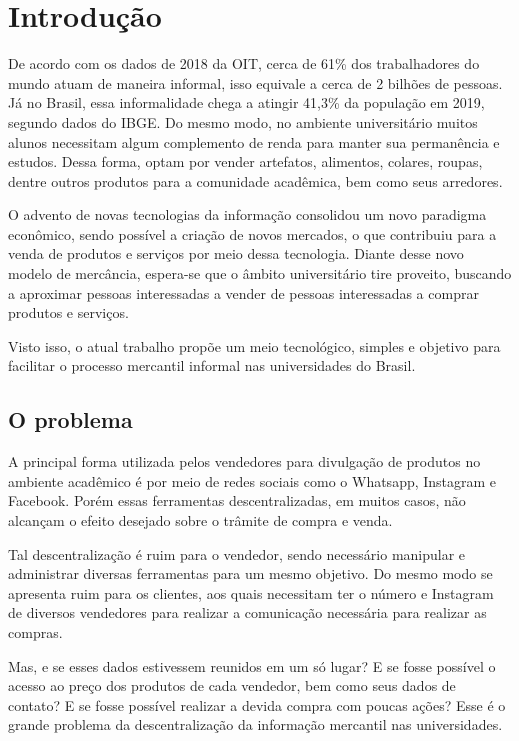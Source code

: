 \chapter{Introdução}


De acordo com os dados de 2018 da OIT\cite{grimshaw2019resumen}, cerca de 61\% dos trabalhadores do mundo atuam de maneira informal, isso equivale a cerca de 2 bilhões de pessoas. Já no Brasil, essa informalidade chega a atingir 41,3\% da população em 2019, segundo dados do IBGE. Do mesmo modo, no ambiente universitário muitos alunos necessitam algum complemento de renda para manter sua permanência e estudos. Dessa forma, optam por vender artefatos, alimentos, colares, roupas, dentre outros produtos para a comunidade acadêmica, bem como seus arredores.

O advento de novas tecnologias da informação consolidou um novo paradigma econômico, sendo possível a criação de novos mercados, o que contribuiu para a venda de produtos e serviços por meio dessa tecnologia. Diante desse novo modelo de mercância, espera-se que o âmbito universitário tire proveito, buscando a aproximar pessoas interessadas a vender de pessoas interessadas a comprar produtos e serviços.

Visto isso, o atual trabalho propõe um meio tecnológico, simples e objetivo para facilitar o processo mercantil informal nas universidades do Brasil.

\section{O problema}

A principal forma utilizada pelos vendedores para divulgação de produtos no ambiente acadêmico é por meio de redes sociais como o Whatsapp, Instagram e Facebook. Porém essas ferramentas descentralizadas, em muitos casos, não alcançam o efeito desejado sobre  o trâmite de compra e venda.

Tal descentralização é ruim para o vendedor, sendo necessário manipular e administrar diversas ferramentas para um mesmo objetivo. Do mesmo modo se apresenta ruim para os clientes, aos quais necessitam ter o número e Instagram de diversos vendedores para realizar a comunicação necessária para realizar as compras. 

Mas, e se esses dados estivessem reunidos em um só lugar? E se fosse possível o acesso ao preço dos produtos de cada vendedor, bem como seus dados de contato? E se fosse possível realizar a devida compra com poucas ações? Esse é o grande problema da descentralização da informação mercantil nas universidades.


